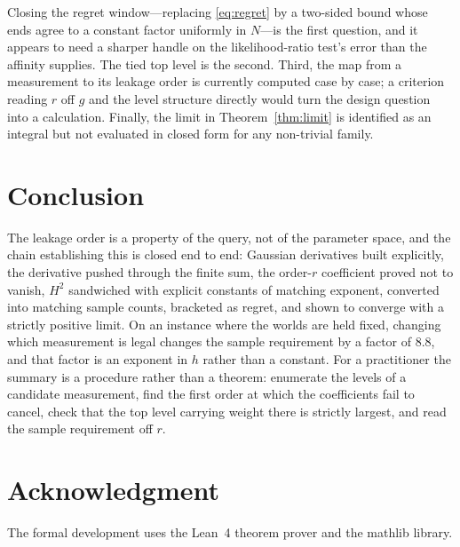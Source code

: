 Closing the regret window---replacing \eqref{eq:regret} by a two-sided bound whose ends agree
to a constant factor uniformly in $N$---is the first question, and it appears to need a
sharper handle on the likelihood-ratio test's error than the affinity supplies. The tied top
level is the second. Third, the map from a measurement to its leakage order is currently
computed case by case; a criterion reading $r$ off $g$ and the level structure directly would
turn the design question into a calculation. Finally, the limit in
Theorem~\ref{thm:limit} is identified as an integral but not evaluated in closed form for any
non-trivial family.

\section{Conclusion}

The leakage order is a property of the query, not of the parameter space, and the chain
establishing this is closed end to end: Gaussian derivatives built explicitly, the derivative
pushed through the finite sum, the order-$r$ coefficient proved not to vanish, $H^{2}$
sandwiched with explicit constants of matching exponent, converted into matching sample
counts, bracketed as regret, and shown to converge with a strictly positive limit. On an
instance where the worlds are held fixed, changing which measurement is legal changes the
sample requirement by a factor of $8.8$, and that factor is an exponent in $h$ rather than a
constant. For a practitioner the summary is a procedure rather than a theorem: enumerate the
levels of a candidate measurement, find the first order at which the coefficients fail to
cancel, check that the top level carrying weight there is strictly largest, and read the
sample requirement off $r$.

\section*{Acknowledgment}

The formal development uses the Lean~4 theorem prover and the mathlib library.

